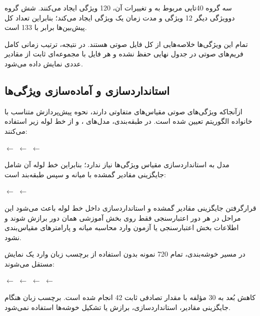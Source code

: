 \documentclass[12pt,a4paper,oneside]{report}
\begin{document}
سه گروه 40تایی مربوط به
و تغییرات آن، 120 ویژگی ایجاد می‌کنند. شش گروه دوویژگی دیگر 12 ویژگی و مدت زمان یک ویژگی ایجاد می‌کند؛ بنابراین تعداد کل پیش‌بین‌ها برابر با 133 است.

تمام این ویژگی‌ها خلاصه‌هایی از کل فایل صوتی هستند. در نتیجه، ترتیب زمانی کامل فریم‌های صوتی در جدول نهایی حفظ نشده و هر فایل با مجموعه‌ای ثابت از مقادیر عددی نمایش داده می‌شود.


\subsection{استانداردسازی و آماده‌سازی ویژگی‌ها}

ازآنجاکه ویژگی‌های صوتی مقیاس‌های متفاوتی دارند، نحوه پیش‌پردازش متناسب با خانواده الگوریتم تعیین شده است. در طبقه‌بندی، مدل‌های
،
و
از خط لوله زیر استفاده می‌کنند:

\begin{center}
$\longleftarrow$
$\longleftarrow$
$\longleftarrow$
\end{center}

مدل
به استانداردسازی مقیاس ویژگی‌ها نیاز ندارد؛ بنابراین خط لوله آن شامل جایگزینی مقادیر گمشده با میانه و سپس طبقه‌بند است:

\begin{center}
$\longleftarrow$
$\longleftarrow$
\end{center}

قرارگرفتن جایگزینی مقادیر گمشده و استانداردسازی داخل خط لوله باعث می‌شود این مراحل در هر دور اعتبارسنجی فقط روی بخش آموزشی همان دور برازش شوند و اطلاعات بخش اعتبارسنجی یا آزمون وارد محاسبه میانه و پارامترهای مقیاس‌بندی نشود.

در مسیر خوشه‌بندی، تمام 720 نمونه بدون استفاده از برچسب زبان وارد یک نمایش مستقل می‌شوند:

\begin{center}
$\longleftarrow$
$\longleftarrow$
$\longleftarrow$
$\longleftarrow$
\end{center}

کاهش بُعد
به 30 مؤلفه با مقدار تصادفی ثابت 42 انجام شده است. برچسب زبان هنگام جایگزینی مقادیر، استانداردسازی، برازش
یا تشکیل خوشه‌ها استفاده نمی‌شود.
\end{document}
